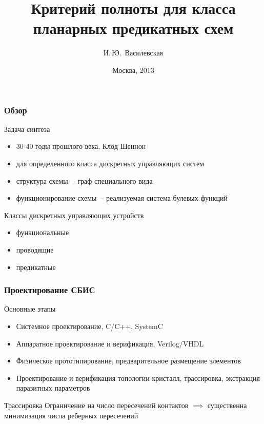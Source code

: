 \documentclass{beamer}
\begin{document}
\title[]{Критерий полноты для класса планарных предикатных схем}
\author{И.\,Ю.~Василевская}

\date{Москва, 2013}

\begin{frame}
	\maketitle
\end{frame}

\begin{frame}
	\frametitle{Обзор}

	\begin{block}{Задача синтеза}
		\begin{itemize}
			\item 30-40 годы прошлого века, Клод Шеннон
            \item для определенного класса дискретных управляющих систем
			\item структура схемы~-- граф специального вида
			\item функционирование схемы~-- реализуемая система булевых функций
		\end{itemize}
	\end{block}

	\begin{block}{Классы дискретных управляющих устройств}
		\begin{itemize}
			\item функциональные
			\item проводящие
			\item предикатные
		\end{itemize}
	\end{block}
\end{frame}

\begin{frame}
    \frametitle{Проектирование СБИС}

    \begin{block}{Основные этапы}
        \begin{itemize}
            \item Системное проектирование, C/C++, SystemC
            \item Аппаратное проектирование и верификация, Verilog/VHDL
            \item Физическое прототипирование, предварительное размещение элементов
            \item Проектирование и верификация топологии кристалл, трассировка, экстракция паразитных
            параметров
        \end{itemize}
    \end{block}

    \begin{block}{Трассировка}
        Ограничение на число пересечений контактов $\implies$ существенна минимизация числа реберных пересечений 
    \end{block}
\end{frame}
\end{document}
